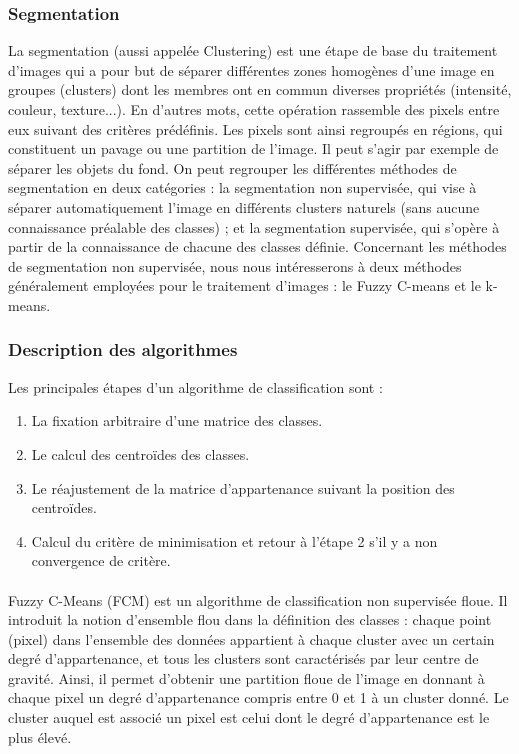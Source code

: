 \subsubsection{Segmentation}

La segmentation (aussi appelée Clustering) \cite{d2004etude} est une étape de base du traitement d’images qui a pour but de séparer différentes zones homogènes d’une image en groupes (clusters) dont les membres ont en commun diverses propriétés (intensité, couleur, texture...). En d’autres mots, cette opération rassemble des pixels entre eux suivant des critères prédéfinis. Les pixels sont ainsi regroupés en régions, qui constituent un pavage ou une partition de l'image. Il peut s'agir par exemple de séparer les objets du fond. On peut regrouper les différentes méthodes de segmentation en deux catégories : la segmentation non supervisée, qui vise à séparer automatiquement l’image en différents clusters naturels (sans aucune connaissance préalable des classes) ; et la segmentation supervisée, qui s’opère à partir de la connaissance de chacune des classes définie. Concernant les méthodes de segmentation non supervisée, nous nous intéresserons à deux méthodes généralement employées pour le traitement d'images : le Fuzzy C-means et le k-means. 

\subsubsection*{Description des algorithmes}
Les principales étapes d'un algorithme de classification sont :
\begin{enumerate}
\item La fixation arbitraire d’une matrice des classes.
\item Le calcul des centroïdes des classes.
\item Le réajustement de la matrice d’appartenance suivant la position des centroïdes.
\item Calcul du critère de minimisation et retour à l’étape 2 s’il y a non convergence de critère.
\end{enumerate}
\paragraph{}

Fuzzy C-Means (FCM) est un algorithme de classification non supervisée floue. Il introduit la notion d’ensemble flou dans la définition des classes : chaque point (pixel) dans l’ensemble des données appartient à chaque cluster avec un certain degré d’appartenance, et tous les clusters sont caractérisés par leur centre de gravité. Ainsi, il permet d’obtenir une partition floue de l’image en donnant à chaque pixel un degré d’appartenance compris entre 0 et 1 à un cluster donné. Le cluster auquel est associé un pixel est celui dont le degré d’appartenance est le plus élevé.

